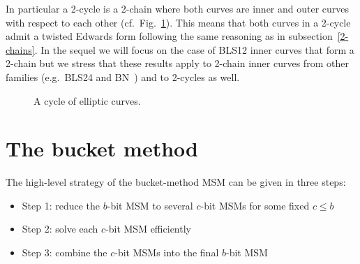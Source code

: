 \documentclass[journal=tches,spthm]{iacrtrans}
\newcommand{\F}{\ensuremath{\mathbb F}}
\begin{document}
In particular a 2-cycle is a 2-chain where both curves are inner and outer
curves with respect to each other (cf.~Fig.~\ref{figure:EC-cycle}). This means
that both curves in a 2-cycle admit a twisted Edwards form following the same
reasoning as in subsection~\ref{2-chains}. In the sequel we will focus on the
case of BLS12 inner curves that form a 2-chain but we stress that these results
apply to 2-chain inner curves from other families (e.g.~BLS24 and
BN~\cite{EPRINT:AraHouGui22}) and to 2-cycles as well.
%
\begin{figure}[htb]
  \centering
  {}
\caption{A cycle of elliptic curves.}
  \label{figure:EC-cycle}
\end{figure}
%
\section{The bucket method}
\label{sec:bucket-msm}
The high-level strategy of the bucket-method MSM can be given in three steps:
\begin{itemize}
\item Step 1: reduce the $b$-bit MSM to several $c$-bit MSMs for some fixed $c \leq b$
\item Step 2: solve each $c$-bit MSM efficiently
\item Step 3: combine the $c$-bit MSMs into the final $b$-bit MSM
\end{itemize}
\end{document}
